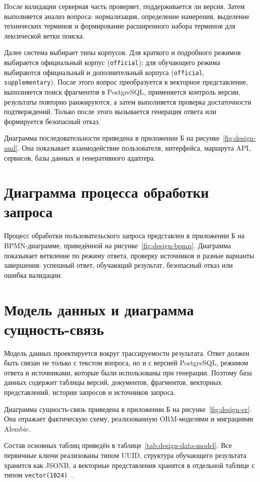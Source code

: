 После валидации серверная часть проверяет, поддерживается ли версия. Затем выполняется анализ вопроса: нормализация, определение намерения, выделение технических терминов и формирование расширенного набора терминов для лексической ветки поиска.

Далее система выбирает типы корпусов. Для краткого и подробного режимов выбирается официальный корпус (\texttt{official}); для обучающего режима выбираются официальный и дополнительный корпуса (\texttt{official}, \texttt{supplementary}). После этого вопрос преобразуется в векторное представление, выполняется поиск фрагментов в PostgreSQL, применяется контроль версии, результаты повторно ранжируются, а затем выполняется проверка достаточности подтверждений. Только после этого вызывается генерация ответа или формируется безопасный отказ.

Диаграмма последовательности приведена в приложении Б на рисунке~\ref{fig:design-uml}. Она показывает взаимодействие пользователя, интерфейса, маршрута API, сервисов, базы данных и генеративного адаптера.

\section{Диаграмма процесса обработки запроса}

Процесс обработки пользовательского запроса представлен в приложении Б на BPMN-диаграмме, приведённой на рисунке~\ref{fig:design-bpmn}. Диаграмма показывает ветвление по режиму ответа, проверку источников и разные варианты завершения: успешный ответ, обучающий результат, безопасный отказ или ошибка валидации.

\section{Модель данных и диаграмма сущность-связь}

Модель данных проектируется вокруг трассируемости результата. Ответ должен быть связан не только с текстом вопроса, но и с версией PostgreSQL, режимом ответа и источниками, которые были использованы при генерации. Поэтому база данных содержит таблицы версий, документов, фрагментов, векторных представлений, истории запросов и источников запроса.

Диаграмма сущность-связь приведена в приложении Б на рисунке~\ref{fig:design-er}. Она отражает фактическую схему, реализованную ORM-моделями и миграциями Alembic.

Состав основных таблиц приведён в таблице~\ref{tab:design-data-model}. Все первичные ключи реализованы типом UUID, структура обучающего результата хранится как JSONB, а векторные представления хранятся в отдельной таблице с типом \texttt{vector(1024)}~\cite{postgres-json-types-current,postgres-uuid-type-current,pgvector}.


